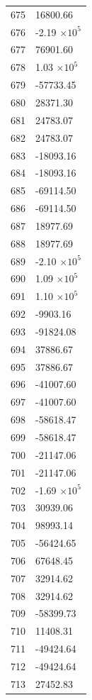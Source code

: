 \documentclass[a4paper,11pt]{article}
\begin{document}
\begin{center}
\begin{longtable}{|R{1.5cm}|R{2.6cm}|}
  675 &     16800.66 \\
  676 &        -2.19 $\times 10^{           5}$ \\
  677 &     76901.60 \\
  678 &         1.03 $\times 10^{           5}$ \\
  679 &    -57733.45 \\
  680 &     28371.30 \\
  681 &     24783.07 \\
  682 &     24783.07 \\
  683 &    -18093.16 \\
  684 &    -18093.16 \\
  685 &    -69114.50 \\
  686 &    -69114.50 \\
  687 &     18977.69 \\
  688 &     18977.69 \\
  689 &        -2.10 $\times 10^{           5}$ \\
  690 &         1.09 $\times 10^{           5}$ \\
  691 &         1.10 $\times 10^{           5}$ \\
  692 &     -9903.16 \\
  693 &    -91824.08 \\
  694 &     37886.67 \\
  695 &     37886.67 \\
  696 &    -41007.60 \\
  697 &    -41007.60 \\
  698 &    -58618.47 \\
  699 &    -58618.47 \\
  700 &    -21147.06 \\
  701 &    -21147.06 \\
  702 &        -1.69 $\times 10^{           5}$ \\
  703 &     30939.06 \\
  704 &     98993.14 \\
  705 &    -56424.65 \\
  706 &     67648.45 \\
  707 &     32914.62 \\
  708 &     32914.62 \\
  709 &    -58399.73 \\
  710 &     11408.31 \\
  711 &    -49424.64 \\
  712 &    -49424.64 \\
  713 &     27452.83 \\

\end{longtable}
\end{center}
\end{document}
